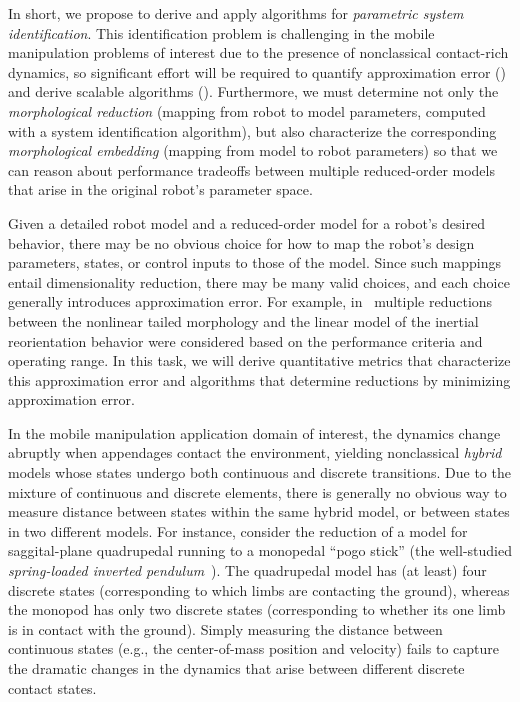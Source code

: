 \documentclass[11pt]{article}
\begin{document}
\noindent
In short, we propose to derive and apply algorithms for \emph{parametric system identification}.
This identification problem is challenging in the mobile manipulation problems of interest due to the presence of nonclassical contact-rich dynamics, so significant effort will be required to quantify approximation error () and derive scalable algorithms ().
Furthermore, we must determine not only the \emph{morphological reduction} (mapping from robot to model parameters, computed with a system identification algorithm), but also characterize the corresponding \emph{morphological embedding} (mapping from model to robot parameters) so that we can reason about performance tradeoffs between multiple reduced-order models that arise in the original robot's parameter space. 


Given a detailed robot model and a reduced-order model for a robot's desired behavior, there may be no obvious choice for how to map the robot's design parameters, states, or control inputs to those of the model.
Since such mappings entail dimensionality reduction, there may be many valid choices,
and
each choice 
generally introduces 
approximation error. 
For example, in~ multiple reductions between the nonlinear tailed morphology and the linear model of the inertial reorientation behavior were considered based on the performance criteria and operating range. 
In this task, we will derive quantitative metrics that characterize this approximation error and algorithms that determine reductions by minimizing approximation error. %

In the mobile manipulation application domain of interest, the dynamics change abruptly when appendages contact the environment, yielding nonclassical \emph{hybrid} models whose states undergo both continuous and discrete transitions.
Due to the mixture of continuous and discrete elements, there is generally no obvious way to measure distance between states within the same hybrid model, or between states in two different models.
For instance, consider the reduction of a model for saggital-plane quadrupedal running to a monopedal ``pogo stick'' (the well-studied \emph{spring-loaded inverted pendulum}~).
The quadrupedal model has (at least) four discrete states (corresponding to which limbs are contacting the ground), whereas the monopod has only two discrete states (corresponding to whether its one limb is in contact with the ground).
Simply measuring the distance between continuous states (e.g., the center-of-mass position and velocity) fails to capture the dramatic changes in the dynamics that arise between different discrete contact states.
\end{document}
